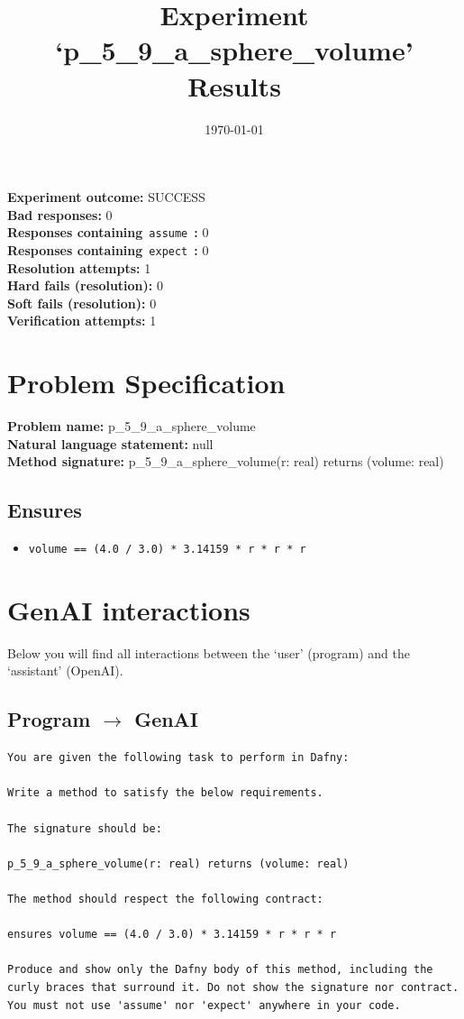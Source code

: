 \documentclass{article}
\begin{document}
\title{Experiment `p\_5\_9\_a\_sphere\_volume' Results}
\author{\today}
\date{}
\maketitle
\textbf{Experiment outcome: }SUCCESS
\\\textbf{Bad responses: }0
\\\textbf{Responses containing}~\texttt{assume}~\textbf{: }0
\\\textbf{Responses containing}~\texttt{expect}~\textbf{: }0
\\\textbf{Resolution attempts: }1
\\\textbf{Hard fails (resolution): }0
\\\textbf{Soft fails (resolution): }0
\\\textbf{Verification attempts: }1
\section*{Problem Specification}
\textbf{Problem name: }p\_5\_9\_a\_sphere\_volume
\\\textbf{Natural language statement: }null
\\\textbf{Method signature: }p\_5\_9\_a\_sphere\_volume(r: real) returns (volume: real)
\subsection*{Ensures}
\begin{itemize}
\item \texttt{volume == (4.0 / 3.0) * 3.14159 * r * r * r}
\end{itemize}
\clearpage
\section*{GenAI interactions}
Below you will find all interactions between the `user' (program) and the `assistant' (OpenAI).
\subsection*{Program $\rightarrow$ GenAI}
\begin{lstlisting}
You are given the following task to perform in Dafny:

Write a method to satisfy the below requirements.

The signature should be:

p_5_9_a_sphere_volume(r: real) returns (volume: real)

The method should respect the following contract:

ensures volume == (4.0 / 3.0) * 3.14159 * r * r * r

Produce and show only the Dafny body of this method, including the curly braces that surround it. Do not show the signature nor contract. You must not use 'assume' nor 'expect' anywhere in your code.
\end{lstlisting}
\end{document}
